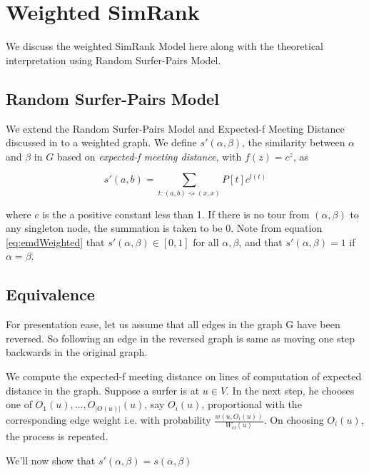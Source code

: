 \chapter{Weighted SimRank}
\label{appendix:weightedSimRank}
We discuss the weighted SimRank Model here along with the theoretical interpretation using Random Surfer-Pairs Model.

\section{Random Surfer-Pairs Model}
We extend the Random Surfer-Pairs Model and Expected-f Meeting Distance discussed in \citep{Jeh02simrank} to a weighted graph.
We define $s'(\alpha,\beta)$, the similarity between $\alpha$ and $\beta$ in $G$ based on \textit{expected-f meeting distance}, with $f(z) = c^z$, as

\begin{equation}
s'(a,b) = \sum_{t:(a,b) \rightsquigarrow (x,x)} P[t]c^{l(t)}  \label{eq:emdWeighted} 
\end{equation}

where $c$ is the a positive constant less than 1. 
If there is no tour from $(\alpha,\beta)$ to any singleton node, the summation is taken to be $0$. 
Note from equation \ref{eq:emdWeighted} that $s'(\alpha,\beta) \in [0, 1]$ for all $\alpha,\beta$, and that $s'(\alpha,\beta) = 1$ if $\alpha=\beta$.

\section{Equivalence}
For presentation ease, let us assume that all edges in the graph G have been reversed. So following an edge in the reversed graph is same as moving one step backwards in the original graph.

We compute the expected-f meeting distance on lines of computation of expected distance in the graph.
Suppose a surfer is at $u \in V$. 
In the next step, he chooses one of $O_1(u), \ldots, O_{|O(u)|}(u)$, say $O_i(u)$, proportional with the corresponding edge weight i.e. with probability $\frac{w(u,O_i(u))}{W_O(u)}$.
On choosing $O_i(u)$, the process is repeated.

We'll now show that $s'(\alpha,\beta) = s(\alpha,\beta)$

